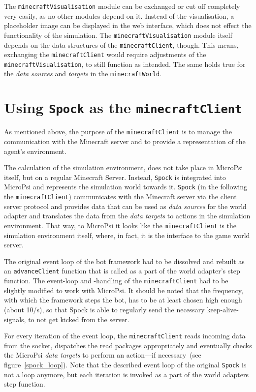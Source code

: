 The \texttt{minecraftVisualisation} module can be exchanged or cut off completely very easily, as no other modules depend on it. Instead of the visualisation, a placeholder image can be displayed in the web interface, which does not effect the functionality of the simulation. The \texttt{minecraftVisualisation} module itself depends on the data structures of the \texttt{minecraftClient}, though. This means, exchanging the \texttt{minecraftClient} would require adjustments of the \texttt{minecraftVisualisation}, to still function as intended. The same holds true for the \emph{data sources} and \emph{targets} in the \texttt{minecraftWorld}.

    \section{Using \texttt{Spock} as the \texttt{minecraftClient}}

As mentioned above, the purpose of the \texttt{minecraftClient} is to manage the communication with the Minecraft server and to provide a representation of the agent's environment.

The calculation of the simulation environment, does not take place in MicroPsi itself, but on a regular Minecraft Server. Instead, \texttt{Spock} is integrated into MicroPsi and represents the simulation world towards it. \texttt{Spock} (in the following the \texttt{minecraftClient}) communicates with the Minecraft server via the client server protocol and provides data that can be used as \emph{data sources} for the world adapter and translates the data from the \emph{data targets} to actions in the simulation environment. That way, to MicroPsi it looks like the \texttt{minecraftClient} is the simulation environment itself, where, in fact, it is the interface to the game world server.

The original event loop of the bot framework had to be dissolved and rebuilt as an \texttt{advanceClient} function that is called as a part of the world adapter's step function. The event-loop and -handling of the \texttt{minecraftClient} had to be slightly modified to work with MicroPsi. It should be noted that the frequency, with which the framework steps the bot, has to be at least chosen high enough (about 10/s), so that Spock is able to regularly send the necessary keep-alive-signals, to not get kicked from the server.

For every iteration of the event loop, the \texttt{minecraftClient} reads incoming data from the socket, dispatches the read packages appropriately and eventually checks the MicroPsi \emph{data targets} to perform an action---if necessary~(see figure~\ref{spock_loop}). Note that the described event loop of the original \texttt{Spock} is not a loop anymore, but each iteration is invoked as a part of the world adapters step function.

